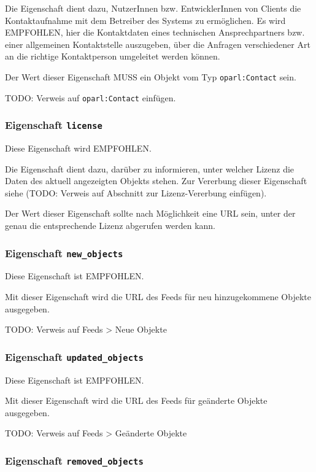 \documentclass[,a4paper]{article}
\begin{document}
Die Eigenschaft dient dazu, NutzerInnen bzw. EntwicklerInnen von Clients
die Kontaktaufnahme mit dem Betreiber des Systems zu ermöglichen. Es
wird EMPFOHLEN, hier die Kontaktdaten eines technischen Ansprechpartners
bzw. einer allgemeinen Kontaktstelle auszugeben, über die Anfragen
verschiedener Art an die richtige Kontaktperson umgeleitet werden
können.

Der Wert dieser Eigenschaft MUSS ein Objekt vom Typ
\texttt{oparl:Contact} sein.

TODO: Verweis auf \texttt{oparl:Contact} einfügen.

\subsubsection{Eigenschaft \texttt{license}}

Diese Eigenschaft wird EMPFOHLEN.

Die Eigenschaft dient dazu, darüber zu informieren, unter welcher Lizenz
die Daten des aktuell angezeigten Objekts stehen. Zur Vererbung dieser
Eigenschaft siehe (TODO: Verweis auf Abschnitt zur Lizenz-Vererbung
einfügen).

Der Wert dieser Eigenschaft sollte nach Möglichkeit eine URL sein, unter
der genau die entsprechende Lizenz abgerufen werden kann.

\subsubsection{Eigenschaft \texttt{new\_objects}}

Diese Eigenschaft ist EMPFOHLEN.

Mit dieser Eigenschaft wird die URL des Feeds für neu hinzugekommene
Objekte ausgegeben.

TODO: Verweis auf Feeds \textgreater{} Neue Objekte

\subsubsection{Eigenschaft \texttt{updated\_objects}}

Diese Eigenschaft ist EMPFOHLEN.

Mit dieser Eigenschaft wird die URL des Feeds für geänderte Objekte
ausgegeben.

TODO: Verweis auf Feeds \textgreater{} Geänderte Objekte

\subsubsection{Eigenschaft \texttt{removed\_objects}}
\end{document}
